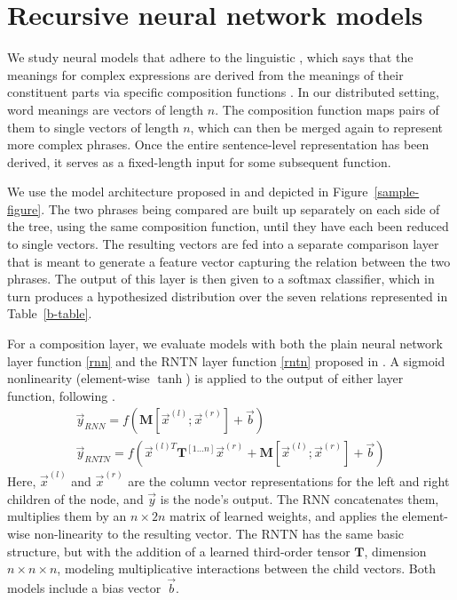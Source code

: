 
\section{Recursive neural network models} \label{methods}

We study neural models that adhere to the linguistic , which says that the meanings for complex
expressions are derived from the meanings of their constituent parts
via specific composition functions \cite{Partee84,Janssen97}. In our
distributed setting, word meanings are vectors of length $n$. The
composition function maps pairs of them to single vectors of length $n$, 
which can then be merged again to represent more complex
phrases. Once the entire sentence-level representation has been
derived, it serves as a fixed-length input for some subsequent function.

We use the model architecture proposed in \cite{bowman2013can} and
depicted in Figure~\ref{sample-figure}. The two phrases being compared
are built up separately on each side of the tree, using the same
composition function, until they have each been reduced to single
vectors. The resulting vectors are fed into a separate comparison
layer that is meant to generate a feature vector capturing the
relation between the two phrases. The output of this layer is then
given to a softmax classifier, which in turn produces a hypothesized
distribution over the seven relations represented in Table~\ref{b-table}.


For a composition layer, we evaluate models with both the plain neural
network layer function \eqref{rnn} and the RNTN layer function
\eqref{rntn} proposed in \citet{chen2013learning}. A sigmoid
nonlinearity (element-wise $\tanh$) is applied to the output of either
layer function, following \cite{socher2013acl1}.
%
\begin{gather} \label{rnn}
\vec{y}_{\textit{RNN}} = f(\mathbf{M} [\vec{x}^{(l)}; \vec{x}^{(r)}] + \vec{b}) \\ %
\label{rntn}
\vec{y}_{\textit{RNTN}} = f(\vec{x}^{(l)T} \mathbf{T}^{[1 \ldots n]} \vec{x}^{(r)} + \mathbf{M} [\vec{x}^{(l)}; \vec{x}^{(r)}] + \vec{b})
\end{gather} 
%
Here, $\vec{x}^{(l)}$ and $\vec{x}^{(r)}$ are the column vector
representations for the left and right children of the node, and
$\vec{y}$ is the node's output.  The RNN concatenates them, multiplies
them by an $n \times 2n$ matrix of learned weights, and applies the
element-wise non-linearity to the resulting vector. The RNTN has the
same basic structure, but with the addition of a learned third-order
tensor $\mathbf{T}$, dimension $n \times n \times n$, modeling
multiplicative interactions between the child vectors. Both models
include a bias vector~$\vec{b}$.


